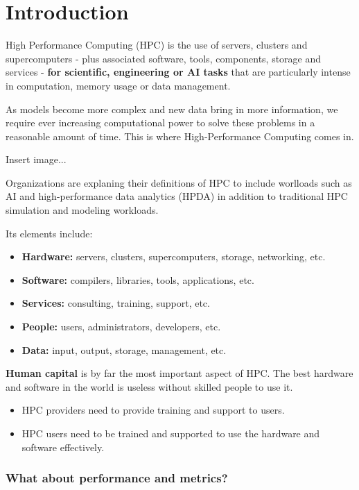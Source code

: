 \chapter{Introduction}

\begin{definitionblock}
    High Performance Computing (HPC) is the use of servers, clusters and supercomputers - plus associated software, tools, components, storage and services - \textbf{for scientific, engineering or AI tasks} that are particularly intense in computation, memory usage or data management.
\end{definitionblock}

As models become more complex and new data bring in more information, we require ever increasing computational power to solve these problems in a reasonable amount of time. This is where High-Performance Computing comes in.

Insert image...

Organizations are explaning their definitions of HPC to include worlloads such as AI and high-performance data analytics (HPDA) in addition to traditional HPC simulation and modeling workloads. 

Its elements include: 
\begin{itemize}
    \item \textbf{Hardware:} servers, clusters, supercomputers, storage, networking, etc.
    \item \textbf{Software:} compilers, libraries, tools, applications, etc.
    \item \textbf{Services:} consulting, training, support, etc.
    \item \textbf{People:} users, administrators, developers, etc.
    \item \textbf{Data:} input, output, storage, management, etc.
\end{itemize}

\textbf{Human capital} is by far the most important aspect of HPC. The best hardware and software in the world is useless without skilled people to use it.
\begin{itemize}
    \item HPC providers need to provide training and support to users.
    \item HPC users need to be trained and supported to use the hardware and software effectively.
\end{itemize}

\subsection*{What about performance and metrics?}

